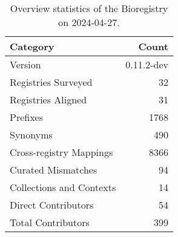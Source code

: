 \begin{table}
\caption{Overview statistics of the Bioregistry on 2024-04-27.}
\label{tab:bioregistry-summary}
\begin{tabular}{lr}
\toprule
Category & Count \\
\midrule
Version & 0.11.2-dev \\
Registries Surveyed & 32 \\
Registries Aligned & 31 \\
Prefixes & 1768 \\
Synonyms & 490 \\
Cross-registry Mappings & 8366 \\
Curated Mismatches & 94 \\
Collections and Contexts & 14 \\
Direct Contributors & 54 \\
Total Contributors & 399 \\
\bottomrule
\end{tabular}
\end{table}
